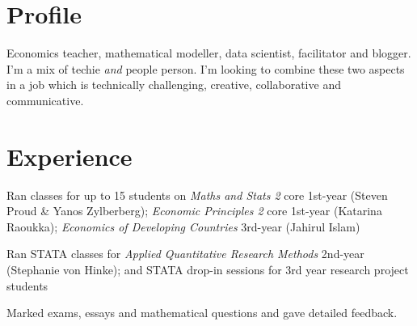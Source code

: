 \documentclass[a4paper]{deedy-resume} %
\begin{document}

\lastupdated %


%
\begin{minipage}[t]{0.66\textwidth} %


    \section{Profile}
    Economics teacher, mathematical modeller, data scientist, facilitator and blogger.
	I'm a mix of techie \textit{and} people person. I'm looking to combine these two aspects in a job which is technically challenging, creative, collaborative and communicative.


    \section{Experience}

    
    \vspace{\topsep} %
    \begin{tightitemize}
    	\item Ran classes for up to 15 students on 
	    	\textit{Maths and Stats 2} core 1st-year (Steven Proud \& Yanos Zylberberg);
		    \textit{Economic Principles 2} core 1st-year (Katarina Raoukka);
		    \textit{Economics of Developing Countries} 3rd-year (Jahirul Islam)
		\item Ran STATA classes for \textit{Applied Quantitative Research Methods} 2nd-year (Stephanie von Hinke); and STATA drop-in sessions for 3rd year research project students
		\item Marked exams, essays and mathematical questions and gave detailed feedback.
    	

\end{tightitemize}
\end{minipage}
\end{document}
